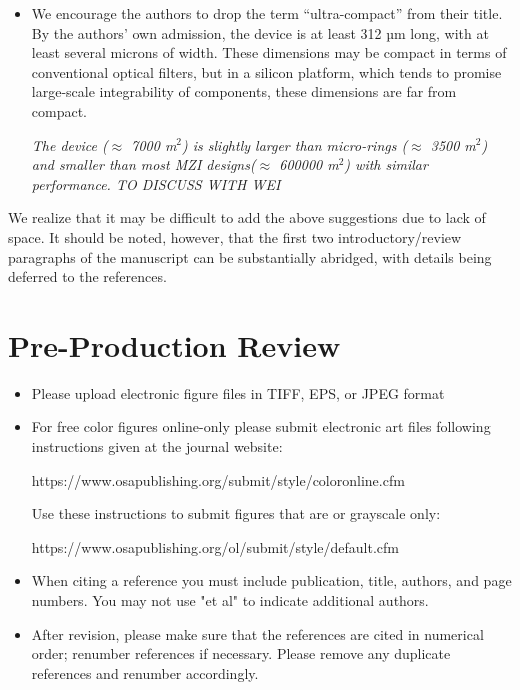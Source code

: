 \documentclass[]{article}
\begin{document}
\begin{itemize}
\item We encourage the authors to drop the term “ultra-compact” from their title. By the authors’ own admission, the device is at least 312 µm long, with at least several microns of width. These dimensions may be compact in terms of conventional optical filters, but in a silicon platform, which tends to promise large-scale integrability of components, these dimensions are far from compact.

\emph{The device ($\approx$ 7000 \textmu m$^2$) is slightly larger than micro-rings ($\approx$ 3500 \textmu m$^2$) and smaller than most MZI designs($\approx$ 600000 \textmu m$^2$) with similar performance. TO DISCUSS WITH WEI }
\end{itemize}


We realize that it may be difficult to add the above suggestions due to lack of space. It should be noted, however, that the first two introductory/review paragraphs of the manuscript can be substantially abridged, with details being deferred to the references.


\section*{Pre-Production Review}
\begin{itemize}
\item Please upload electronic figure files in TIFF, EPS, or JPEG format

\item For free color figures online-only please submit electronic art files following instructions given at the journal website:

 https://www.osapublishing.org/submit/style/coloronline.cfm 
 
Use these instructions to submit figures that are or grayscale only:

 https://www.osapublishing.org/ol/submit/style/default.cfm

\item When citing a reference you must include publication, title, authors, and page numbers. You may not use "et al" to indicate additional authors.

\item After revision, please make sure that the references are cited in numerical order; renumber references if necessary. Please remove any duplicate references and renumber accordingly.
\end{itemize}
\end{document}
